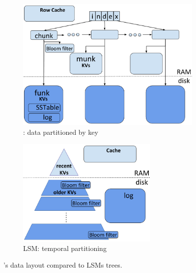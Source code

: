 \begin{figure}[tb]
\begin{subfigure}{0.5\linewidth}\centering
\includegraphics[width=0.75\columnwidth]{PiWi.png}
\caption{\sys: data partitioned by key}
\label{fig:piwi}
\end{subfigure}
\begin{subfigure}{0.5\linewidth}\centering
\includegraphics[width=0.75\textwidth]{LSM.png}
\caption{LSM: temporal partitioning}
\label{fig:lsm}
\end{subfigure}
\caption{\sys's data layout compared to LSMs trees.}%
\label{fig:layout}
\end{figure}


